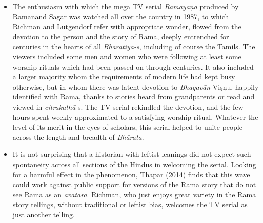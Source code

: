 \begin{itemize}
\item The enthusiasm with which the mega TV serial \textit{Rāmāyaṇa} produced by Ramanand Sagar was watched all over the country in 1987, to which Richman and Lutgendorf refer with appropriate wonder, flowed from the devotion to the person and the story of Rāma, deeply entrenched for centuries in the hearts of all \textit{Bhāratiya-s}, including of course the Tamils. The viewers included some men and women who were following at least some worship-rituals which had been passed on through centuries. It also included a larger majority whom the requirements of modern life had kept busy otherwise, but in whom there was latent devotion to \textit{Bhagavān} Viṣṇu, happily identified with Rāma, thanks to stories heard from grandparents or read and viewed in \textit{citrakathā}-s. The TV serial rekindled the devotion, and the few hours spent weekly approximated to a satisfying worship ritual. Whatever the level of its merit in the eyes of scholars, this serial helped to unite people across the length and breadth of \textit{Bhārata}.

 \item It is not surprising that a historian with leftist leanings did not expect such spontaneity across all sections of the Hindus in welcoming the serial. Looking for a harmful effect in the phenomenon, Thapar (2014) finds that this wave could work against public support for versions of the Rāma story that do not see Rāma as an \textit{avatāra}. Richman, who just enjoys great variety in the Rāma story tellings, without traditional or leftist bias, welcomes the TV serial as just another telling.


\end{itemize}
